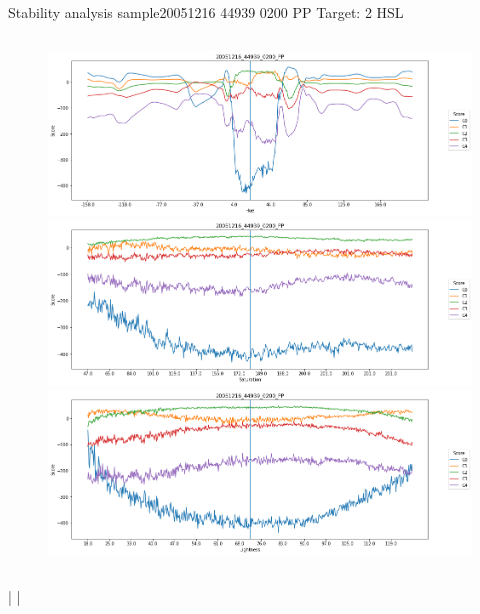 \documentclass{beamer}
\begin{document}
\begin{frame}{Stability analysis sample}{20051216 44939 0200 PP Target: 2 HSL}
\begin{columns}
\begin{column}{0.45\textwidth}
\begin{figure}[p]
		\includegraphics[width=\textwidth]{chapter_stability/20051216_44939_0200_PP/h/scores.png}			\includegraphics[width=\textwidth]{chapter_stability/20051216_44939_0200_PP/s/scores.png}			\includegraphics[width=\textwidth]{chapter_stability/20051216_44939_0200_PP/l/scores.png}
	\end{figure}
\end{column}
\end{columns}
\href{run:videos_stability/Messidor_20051216_44939_0200_PP_Target_2_Checking_Hue_Sensitivity.mp4}{\color{blue}{Hue}} | \href{run:videos_stability/Messidor_20051216_44939_0200_PP_Target_2_Checking_Saturation_Sensitivity.mp4}{\color{blue}{Saturation}} | \href{run:videos_stability/Messidor_20051216_44939_0200_PP_Target_2_Checking_Luminance_Sensitivity.mp4}{\color{blue}{Lightness}}
\end{frame}
\end{document}
